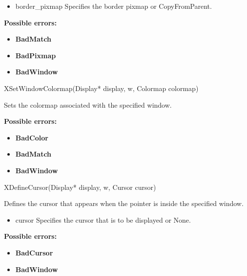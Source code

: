 \documentclass{report}
\begin{document}
\begin{itemize}
            \begin{itemize}
                \item border\_pixmap Specifies the border pixmap or CopyFromParent.
            \end{itemize}

            \bigbreak \noindent
            \textbf{Possible errors:}
            \begin{itemize}
                \item \textbf{BadMatch}
                \item \textbf{BadPixmap}
                \item \textbf{BadWindow}
            \end{itemize}

            \begin{cppcode}
                XSetWindowColormap(Display* display, w, Colormap colormap)
            \end{cppcode}
            \bigbreak \noindent
            Sets the colormap associated with the specified window.

            \bigbreak \noindent
            \textbf{Possible errors:}
            \begin{itemize}
                \item \textbf{BadColor}
                \item \textbf{BadMatch}
                \item \textbf{BadWindow}
            \end{itemize}

            \begin{cppcode}
                XDefineCursor(Display* display, w, Cursor cursor)
            \end{cppcode}
            \bigbreak \noindent
            Defines the cursor that appears when the pointer is inside the specified window.

            \begin{itemize}
                \item cursor Specifies the cursor that is to be displayed or None.
            \end{itemize}

            \bigbreak \noindent
            \textbf{Possible errors:}
            \begin{itemize}
                \item \textbf{BadCursor}
                \item \textbf{BadWindow}
            \end{itemize}


\end{itemize}
\end{document}

